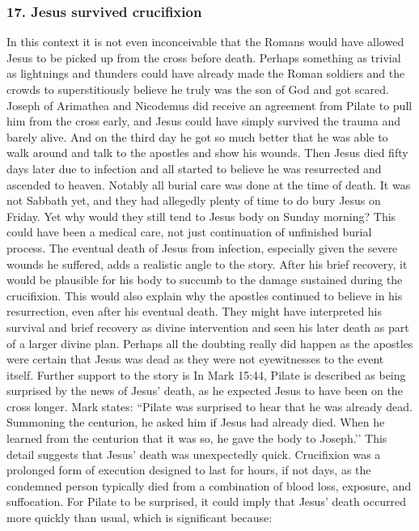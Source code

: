 \subsubsection{17.
Jesus survived crucifixion}\label{subsubsec:jesus-survived-crucifixion}
In this context it is not even inconceivable that the Romans would have allowed Jesus to be picked up from the cross before death.
Perhaps something as trivial as lightnings and thunders could have already made the Roman soldiers and the crowds to superstitiously believe he truly was the son of God and got scared.
Joseph of Arimathea and Nicodemus did receive an agreement from Pilate to pull him from the cross early, and Jesus could have simply survived the trauma and barely alive.
And on the third day he got so much better that he was able to walk around and talk to the apostles and show his wounds.
Then Jesus died fifty days later due to infection and all started to believe he was resurrected and ascended to heaven.
Notably all burial care was done at the time of death.
It was not Sabbath yet, and they had allegedly plenty of time to do bury Jesus on Friday.
Yet why would they still tend to Jesus body on Sunday morning?
This could have been a medical care, not just continuation of unfinished burial process.
The eventual death of Jesus from infection, especially given the severe wounds he suffered, adds a realistic angle to the story.
After his brief recovery, it would be plausible for his body to succumb to the damage sustained during the crucifixion.
This would also explain why the apostles continued to believe in his resurrection, even after his eventual death.
They might have interpreted his survival and brief recovery as divine intervention and seen his later death as part of a larger divine plan.
Perhaps all the doubting really did happen as the apostles were certain that Jesus was dead as they were not eyewitnesses to the event itself.
Further support to the story is In Mark 15:44, Pilate is described as being surprised by the news of Jesus’ death, as he expected Jesus to have been on the cross longer.
Mark states: ``Pilate was surprised to hear that he was already dead.
Summoning the centurion, he asked him if Jesus had already died.
When he learned from the centurion that it was so, he gave the body to Joseph.’’ This detail suggests that Jesus’ death was unexpectedly quick.
Crucifixion was a prolonged form of execution designed to last for hours, if not days, as the condemned person typically died from a combination of blood loss, exposure, and suffocation.
For Pilate to be surprised, it could imply that Jesus’ death occurred more quickly than usual, which is significant because:
